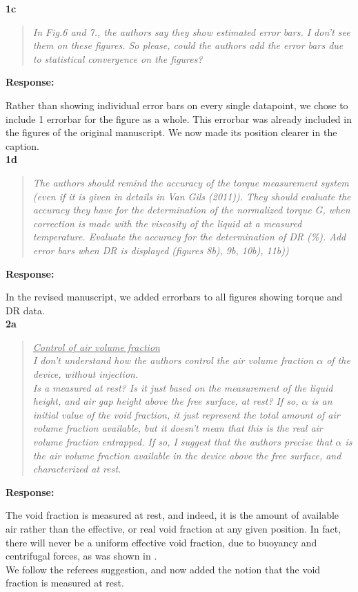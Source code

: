 \documentclass[10pt]{article}
\newcommand{\strong}[1]{\textbf{#1}}
\newcommand{\question}[1]{\begin{quote} \emph{#1}  \end{quote} }
\begin{document}
\noindent \strong{1c}

\question{In Fig.6 and 7., the authors say they show estimated error bars. I don't see them on these figures. So please, could the authors add the error bars due to statistical convergence on the figures?
 }

\noindent \strong{Response:} 

\noindent Rather than showing individual error bars on every single datapoint, we chose to include 1 errorbar for the figure as a whole. This errorbar was already included in the figures of the original manuscript. We now made its position clearer in the caption.\\

\noindent \strong{1d}

\question{The authors should remind the accuracy of the torque measurement system (even if it is given in details in Van Gils (2011)). They should evaluate the accuracy they have for the determination of the normalized torque G, when correction is made with the viscosity of the liquid at a measured temperature. Evaluate the accuracy for the determination of DR (\%). Add error bars when DR is displayed (figures 8b), 9b, 10b), 11b)) }

\noindent \strong{Response:} 

\noindent In the revised manuscript, we added errorbars to all figures showing torque and DR data.\\

\noindent \strong{2a}

\question{\underline{Control of air volume fraction}\\
I don't understand how the authors control the air volume fraction $\alpha$ of the device, without injection.\\
Is a measured at rest? Is it just based on the measurement of the liquid height, and air gap height above the free surface, at rest? If so, $\alpha$ is an initial value of the void fraction, it just represent the total amount of air volume fraction available, but it doesn't mean that this is the real air volume fraction entrapped. If so, I suggest that the authors precise that $\alpha$ is the air volume fraction available in the device above the free surface, and characterized at rest.
 }

\noindent \strong{Response:} 

\noindent The void fraction is measured at rest, and indeed, it is the amount of available air rather than the effective, or real void fraction at any given position. In fact, there will never be a uniform effective void fraction, due to buoyancy and centrifugal forces, as was shown in  \cite{gil13}.   \\
We follow the referees suggestion, and now added the notion that the void fraction is measured at rest.\\
\end{document}
